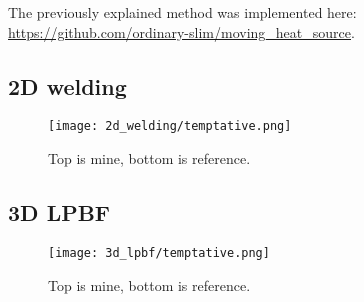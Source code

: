 The previously explained method was implemented
here: \url{https://github.com/ordinary-slim/moving_heat_source}.

\subsection{2D welding}

\begin{figure}[]
  \centering
  \texttt{[image: 2d\_welding/temptative.png]}
  \caption{Top is mine, bottom is reference.}
\end{figure}

\subsection{3D LPBF}

\begin{figure}[h]
  \centering
  \texttt{[image: 3d\_lpbf/temptative.png]}
  \caption{Top is mine, bottom is reference.}
\end{figure}


